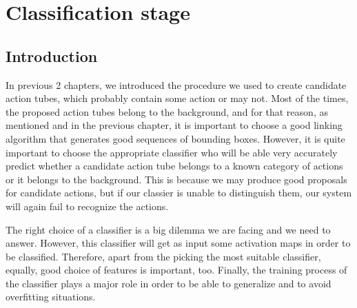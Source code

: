 



% 

\chapter{Classification stage}
\section{Introduction}
In previous 2 chapters, we introduced the procedure we used to create
candidate action tubes, which probably contain some action or may not.
Most of the times, the proposed action tubes belong to the background, and for that reason, as mentioned
and in the previous chapter, it is important to choose a good linking algorithm that generates good sequences of bounding
boxes. However, it is quite important to choose the appropriate classifier who will be able
very accurately predict whether a candidate action tube belongs to a known category of actions or
it belongs to the background. This is because we may produce good proposals for candidate actions, but if our classier
is unable to distinguish them, our system will again fail to recognize the actions. \par

The right choice of a classifier is a big dilemma we are facing and we need to answer. However, this classifier will get as input
some activation maps in order to be classified. Therefore, apart from the picking the most suitable classifier, equally, 
good choice of features is important, too. Finally, the training process of the classifier plays a major role in order to 
be able to generalize and to avoid overfitting situations. \par

